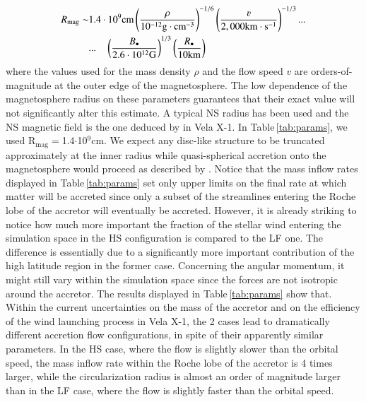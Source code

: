 \documentclass{aa}
\makeatletter
\newcommand*{\ns}{NS\@\xspace}
\makeatother
\begin{document}
\begin{align}
\begin{split}
\label{eq:Rmag}
R_{\text{mag}}\sim & 1.4\cdot 10^9\text{cm}\left(\frac{\rho}{10^{-12}\text{g}\cdot\text{cm}^{-3}}\right)^{-1/6}\left(\frac{\varv}{2,000\text{km}\cdot\text{s}^{-1}}\right)^{-1/3} \text{...}\\
& \text{...} \quad \left(\frac{B_{\bullet}}{2.6\cdot 10^{12}\text{G}}\right)^{1/3}\left(\frac{R_{\bullet}}{10\text{km}}\right)
\end{split}
\end{align}
where the values used for the mass density $\rho$ and the flow speed $v$ are orders-of-magnitude at the outer edge of the magnetosphere. The low dependence of the magnetosphere radius on these parameters guarantees that their exact value will not significantly alter this estimate. A typical \ns radius has been used and the \ns magnetic field is the one deduced by \cite{Furst2014} in Vela X-1. In Table\,\ref{tab:params}, we used R$_{\text{mag}}=$1.4$\cdot$10$^9$cm. We expect any disc-like structure to be truncated approximately at the inner radius \citep{Ghosh1978} while quasi-spherical accretion onto the magnetosphere would proceed as described by \cite{Shakura2013b}. Notice that the mass inflow rates displayed in Table\,\ref{tab:params} set only upper limits on the final rate at which matter will be accreted since only a subset of the streamlines entering the Roche lobe of the accretor will eventually be accreted. However, it is already striking to notice how much more important the fraction of the stellar wind entering the simulation space in the HS configuration is compared to the LF one. The difference is essentially due to a significantly more important contribution of the high latitude region in the former case. Concerning the angular momentum, it might still vary within the simulation space since the forces are not isotropic around the accretor. The results displayed in Table\,\ref{tab:params} show that. Within the current uncertainties on the mass of the accretor and on the efficiency of the wind launching process in Vela X-1, the 2 cases lead to dramatically different accretion flow configurations, in spite of their apparently similar parameters. In the HS case, where the flow is slightly slower than the orbital speed, the mass inflow rate within the Roche lobe of the accretor is 4 times larger, while the circularization radius is almost an order of magnitude larger than in the LF case, where the flow is slightly faster than the orbital speed. 
\end{document}
